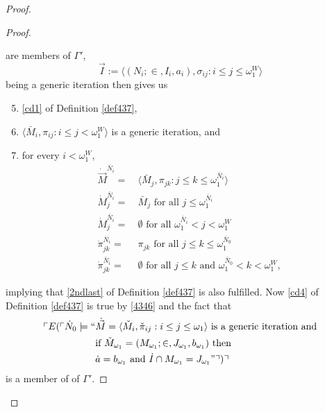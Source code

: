 \documentclass[12pt]{article}
\numberwithin{equation}{section}
\begin{document}
\begin{proof}
\begin{proof}
\begin{itemize}
\end{itemize}
are members of $\Gamma'$, 
\begin{equation*}
    \Vec{I} := \langle (N_i; \in, I_i, a_i), \sigma_{ij} : i \leq j \leq \omega_1^W \rangle
\end{equation*}
being a generic iteration then gives us
\begin{enumerate}[label=(\alph*)]
    \setcounter{enumi}{4}
    \item \ref{cd1} of Definition \ref{def437},
    \item $\langle \bar{M}_i, \pi_{ij} : i \leq j < \omega_1^W \rangle$ is a generic iteration, and
    \item for every $i < \omega_1^W$,
    \begin{align*}
         \dot{\Vec{M}}^{\bar{N}_i} = \ & \langle \bar{M}_j, \pi_{jk} : j \leq k \leq \omega_1^{\bar{N}_i} \rangle \\
         \dot{M}_j^{\bar{N}_i} = \ & \bar{M}_j \text{ for all } j \leq \omega_1^{\bar{N}_i} \\
         \dot{M}_j^{\bar{N}_i} = \ & \emptyset \text{ for all } \omega_1^{\bar{N}_i} < j < \omega_1^W \\
         \dot{\pi}_{jk}^{\bar{N}_i} = \ & \pi_{jk} \text{ for all } j \leq k \leq \omega_1^{\bar{N}_0} \\
         \dot{\pi}_{jk}^{\bar{N}_i} = \ & \emptyset \text{ for all } j \leq k \text{ and } \omega_1^{\bar{N}_0} < k < \omega_1^W \text{,}
    \end{align*}
\end{enumerate}
implying that \ref{2ndlast} of Definition \ref{def437} is also fulfilled. Now \ref{cd4} of Definition \ref{def437} is true by \ref{4346} and the fact that 
\begin{align*}
    \ulcorner E(\ulcorner \dot{N}_0 \models `` & \dot{\Vec{M}} = \langle \check{M}_{i}, \check{\pi}_{ij} : i \leq j \leq \omega_1 \rangle \text{ is a generic iteration and} \\ 
    & \text{if } \check{M}_{\omega_1} = (M_{\omega_1}; \in, J_{\omega_1}, b_{\omega_1}) \text{ then} \\
    &  \dot{a} = b_{\omega_1} \text{ and } \dot{I} \cap M_{\omega_1} = J_{\omega_1}" \urcorner) \urcorner
\end{align*}
is a member of of $\Gamma'$.


\end{proof}
\end{proof}
\end{document}
